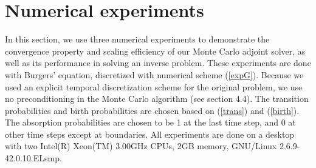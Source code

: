     \vspace{3mm}
    \vspace{3mm}





\section{Numerical experiments}
    In this section, we use three numerical experiments to demonstrate
    the convergence property and scaling efficiency of our Monte Carlo
    adjoint solver, as well as its performance in solving an inverse
    problem.  These experiments are done with Burgers' equation,
    discretized with numerical scheme (\ref{expG}).  Because we used an
    explicit temporal discretization scheme for the original problem,
    we use no preconditioning in the Monte Carlo algorithm (see section 4.4).
    The transition probabilities and birth probabilities are chosen based
    on (\ref{trans}) and (\ref{birth}).  The absorption probabilities are
    chosen to be 1 at the last time step, and 0 at other time steps except
    at boundaries.  All experiments are done on a desktop with two Intel(R)
    Xeon(TM) 3.00GHz CPUs, 2GB memory, GNU/Linux 2.6.9-42.0.10.ELsmp.
    


